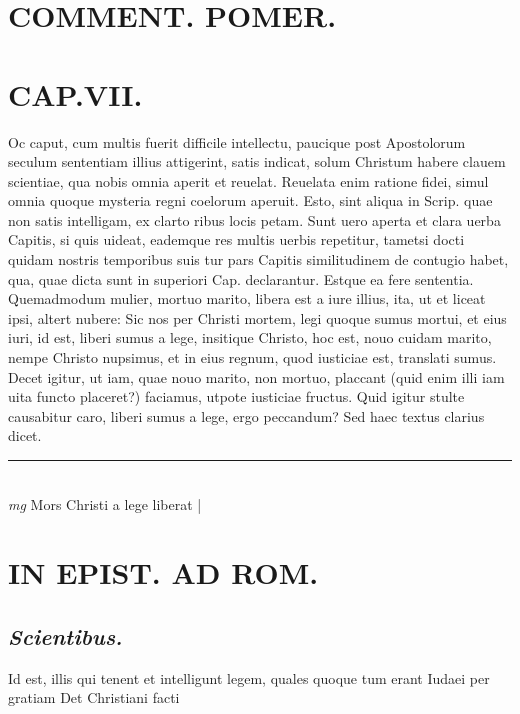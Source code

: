 \documentclass{article}
\begin{document}
\begin{pages}
\section*{COMMENT. POMER.  }
\endnumbering\beginnumbering\section{CAP.VII.}\pstart \huge\textbf{}\normalsize Oc caput, cum multis fuerit difficile intellectu, paucique post Apostolorum seculum sententiam illius attigerint, satis indicat, solum Christum habere clauem scientiae, qua nobis omnia aperit et reuelat. Reuelata enim ratione fidei, simul omnia quoque mysteria regni coelorum aperuit. Esto, sint aliqua in Scrip. quae non satis intelligam, ex clarto ribus locis petam. Sunt uero aperta et clara uerba Capitis, si quis uideat, eademque res multis uerbis repetitur, tametsi docti quidam nostris temporibus suis tur pars Capitis similitudinem de contugio habet, qua, quae dicta sunt in superiori Cap. declarantur. Estque ea fere sententia. Quemadmodum mulier, mortuo marito, libera est a iure illius, ita, ut et liceat ipsi, altert nubere: Sic nos per Christi mortem, legi quoque  sumus mortui, et eius iuri, id est, liberi sumus a lege, insitique Christo, hoc est, nouo cuidam marito, nempe Christo nupsimus, et in eius regnum, quod iusticiae est, translati sumus. Decet igitur, ut iam, quae nouo marito, non mortuo, placcant (quid enim illi iam uita functo placeret?) faciamus, utpote iusticiae fructus. Quid igitur stulte causabitur caro, liberi sumus a lege, ergo peccandum? Sed haec textus clarius dicet.  \pend
\vspace{0.5cm}\noindent
\vspace{0.2cm}\rule{1cm}{0.2pt}\\ 
\hspace{0.2cm}\textit{mg}
\footnotesize Mors Christi a lege liberat 
\normalsize| 
\section*{IN EPIST. AD ROM.  }
\marginpar{[ p.68 ]}
{}
\subsection*{\textit{Scientibus. }}\pstart Id est, illis qui tenent et intelligunt legem, quales quoque tum erant Iudaei per gratiam Det Christiani facti  \pend
{}
{}

\end{pages}
\end{document}
